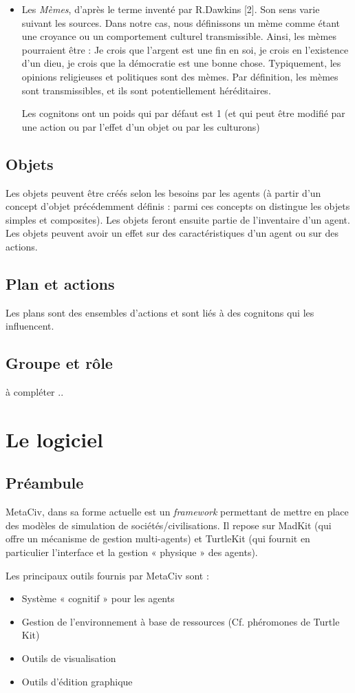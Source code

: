 \documentclass[a4paper,oneside,12 pt]{article}
\begin{document}
\begin{itemize}
\item 	Les \textit{Mèmes}, d'après le terme inventé par R.Dawkins [2]. Son sens varie suivant les sources. Dans notre cas, nous définissons un mème comme étant une croyance ou un comportement culturel transmissible. Ainsi, les mèmes pourraient être : Je crois que l'argent est une fin en soi, je crois en l'existence d'un dieu, je crois que la démocratie est une bonne chose. Typiquement, les opinions religieuses et politiques sont des mèmes. Par définition, les mèmes sont transmissibles, et ils sont potentiellement héréditaires.
	
Les cognitons ont un poids qui par défaut est 1 (et qui peut être modifié par une action ou  par l'effet d'un objet ou par les culturons)
\end{itemize}
\subsection{Objets}
Les objets peuvent être créés selon les besoins par les agents (à partir d'un concept d'objet précédemment définis : parmi ces concepts on distingue les objets simples et composites). Les objets feront ensuite partie de l'inventaire d'un agent. Les objets peuvent avoir un effet sur des caractéristiques d'un agent ou sur des actions. 
\subsection{Plan et actions}
Les plans sont des ensembles d'actions et sont liés à des cognitons qui les influencent.
\subsection{Groupe et rôle}
à compléter ..
\section{Le  logiciel}
\subsection{Préambule}
MetaCiv, dans sa forme actuelle est un \textit{framework} permettant de mettre en place des modèles de simulation de sociétés/civilisations. Il repose sur MadKit (qui offre un mécanisme de gestion multi-agents) et TurtleKit (qui fournit en particulier l’interface et la gestion « physique » des agents).

Les principaux outils fournis par MetaCiv sont :
\begin{itemize}
\item Système « cognitif » pour les agents
\item Gestion de l’environnement à base de ressources (Cf. phéromones de Turtle Kit)
\item Outils de visualisation
\item Outils d’édition graphique
\end{itemize}
\end{document}
